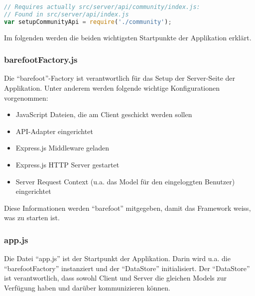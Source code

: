 \begin{lstlisting}[language=JavaScript, caption=Einbindung der Community-Komponente, float=ht!]
// Requires actually src/server/api/community/index.js:
// Found in src/server/api/index.js
var setupCommunityApi = require('./community');
\end{lstlisting}

Im folgenden werden die beiden wichtigsten Startpunkte der Applikation erklärt.

\subsubsection*{barefootFactory.js}
Die ``barefoot''-Factory \cite{barefootFactoryjs} ist verantwortlich für das Setup der Server-Seite der Applikation.
Unter anderem werden folgende wichtige Konfigurationen vorgenommen:
\begin{itemize}
	\item{JavaScript Dateien, die am Client geschickt werden sollen}
	\item{API-Adapter eingerichtet}
	\item{Express.js \cite{Expressjs} Middleware geladen}
	\item{Express.js \cite{Expressjs} HTTP Server gestartet}
	\item{Server Request Context (u.a. das Model für den eingeloggten Benutzer) eingerichtet}
\end{itemize}

Diese Informationen werden ``barefoot'' \cite{Barefoot} mitgegeben, damit das Framework weiss, was zu starten ist.

\subsubsection*{app.js}
Die Datei ``app.js'' \cite{appjs} ist der Startpunkt der Applikation.
Darin wird u.a. die ``barefootFactory'' instanziert und der ``DataStore'' initialisiert. Der ``DataStore'' ist verantwortlich, dass sowohl Client und Server die gleichen Models zur Verfügung haben und darüber kommunizieren können.
